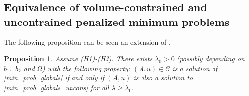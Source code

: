 \documentclass[reqno]{amsart}
\numberwithin{equation}{section}
\theoremstyle{plain}
\newtheorem{proposition}[theorem]{Proposition}
\theoremstyle{definition}
\newcommand{\bound}{b}
\newcommand{\admissible}{\mathcal{C}}
\begin{document}
 
\appendix 
\section{}


\subsection{Equivalence of volume-constrained and uncontrained penalized minimum  problems}

The following proposition can be seen  an  extension of \cite[Theorem 1.1]{EF:2011}.

\begin{proposition}\label{prop:fusco}
Assume  (H1)-(H3). There exists $\lambda_0>0$ (possibly depending on $\bound_1,$ $\bound_2$ and $\Omega$) with the following property:  $(A,u)\in \admissible$ is a solution of \eqref{min_prob_globals} if and only if $(A,u)$ is also a solution to \eqref{min_prob_globals_uncons} for all $\lambda\ge \lambda_0.$ 
\end{proposition}
\end{document}
